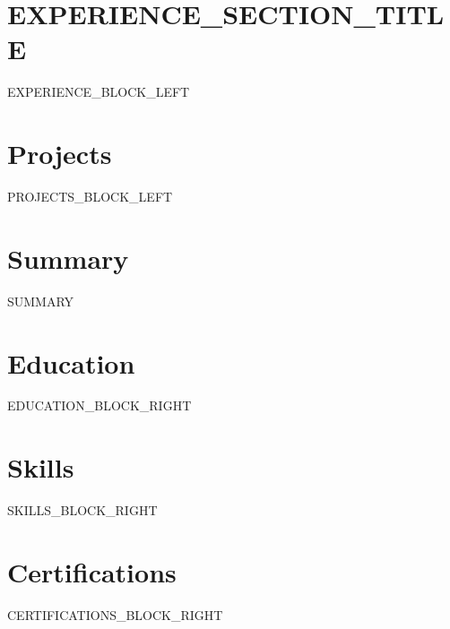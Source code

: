 \documentclass[10pt, letterpaper]{article}
\newenvironment{tightitemize}{
    \begin{itemize}[topsep=3pt, parsep=1pt, partopsep=0pt, itemsep=3pt, leftmargin=10pt]
}{\end{itemize}}
\begin{document}
\noindent
\begin{minipage}[t]{0.61\textwidth}
\vspace{0pt}

\section{{{EXPERIENCE_SECTION_TITLE}}}
{{EXPERIENCE_BLOCK_LEFT}}

\section{Projects}
{{PROJECTS_BLOCK_LEFT}}

\end{minipage}%
\hfill
\begin{minipage}[t]{0.36\textwidth}
\vspace{0pt}

\section{Summary}
{\small {{SUMMARY}}}

\vspace{0.2cm}

\section{Education}
{{EDUCATION_BLOCK_RIGHT}}

\section{Skills}
{\small {{SKILLS_BLOCK_RIGHT}}}

\vspace{0.1cm}

\section{Certifications}
\begin{tightitemize}
    \small
    {{CERTIFICATIONS_BLOCK_RIGHT}}
\end{tightitemize}

\end{minipage}
\end{document}
